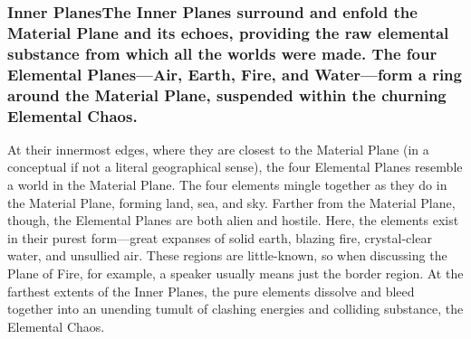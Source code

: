 \documentclass[
]{article}
\begin{document}
\hypertarget{inner-planesthe-inner-planes-surround-and-enfold-the-material-plane-and-its-echoes-providing-the-raw-elemental-substance-from-which-all-the-worlds-were-made-the-four-elemental-planesair-earth-fire-and-waterform-a-ring-around-the-material-plane-suspended-within-the-churning-elemental-chaos}{%
\subsubsection{\texorpdfstring{Inner PlanesThe Inner Planes surround and
enfold the Material Plane and its echoes, providing the raw elemental
substance from which all the worlds were made. The four
\textbf{Elemental Planes}---Air, Earth, Fire, and Water---form a ring
around the Material Plane, suspended within the churning
\textbf{Elemental
Chaos}.}{Inner PlanesThe Inner Planes surround and enfold the Material Plane and its echoes, providing the raw elemental substance from which all the worlds were made. The four Elemental Planes---Air, Earth, Fire, and Water---form a ring around the Material Plane, suspended within the churning Elemental Chaos.}}\label{inner-planesthe-inner-planes-surround-and-enfold-the-material-plane-and-its-echoes-providing-the-raw-elemental-substance-from-which-all-the-worlds-were-made-the-four-elemental-planesair-earth-fire-and-waterform-a-ring-around-the-material-plane-suspended-within-the-churning-elemental-chaos}}

At their innermost edges, where they are closest to the Material Plane
(in a conceptual if not a literal geographical sense), the four
Elemental Planes resemble a world in the Material Plane. The four
elements mingle together as they do in the Material Plane, forming land,
sea, and sky. Farther from the Material Plane, though, the Elemental
Planes are both alien and hostile. Here, the elements exist in their
purest form---great expanses of solid earth, blazing fire, crystal-clear
water, and unsullied air. These regions are little-known, so when
discussing the Plane of Fire, for example, a speaker usually means just
the border region. At the farthest extents of the Inner Planes, the pure
elements dissolve and bleed together into an unending tumult of clashing
energies and colliding substance, the Elemental Chaos.
\end{document}
